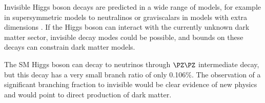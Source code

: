 Invisible Higgs boson decays are predicted in a wide range of models, for example in supersymmetric models to neutralinos \cite{ARTICLE:MSSMInvisibleHiggs} or graviscalars in models with extra dimensions \cite{ARTICLE:Graviscalars,ARTICLE:ADDInvisible}. If the Higgs boson can interact with the currently unknown dark matter sector, invisible decay modes could be possible, and bounds on these decays can constrain dark matter models.

The \gls{SM} Higgs boson can decay to neutrinos through $\PZ\PZ$ intermediate decay, but this decay has a very small branch ratio of only 0.106\%. The observation of a significant branching fraction to invisible would be clear evidence of new physics and would point to direct production of dark matter.



